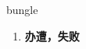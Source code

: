 
\begin{frame}
{\huge bungle}
\begin{center}
\begin{enumerate}\Large
  \item \textbf{办遭，失败}
\end{enumerate}
\end{center}
\end{frame}
